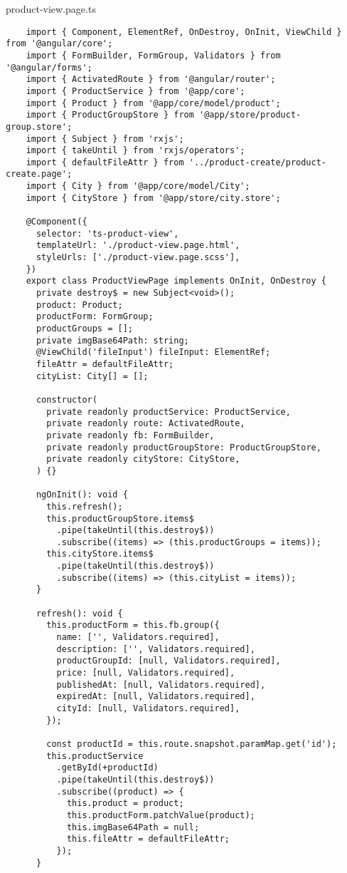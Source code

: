 product-view.page.ts
\lstset{style=ts}
\begin{lstlisting}
    import { Component, ElementRef, OnDestroy, OnInit, ViewChild } from '@angular/core';
    import { FormBuilder, FormGroup, Validators } from '@angular/forms';
    import { ActivatedRoute } from '@angular/router';
    import { ProductService } from '@app/core';
    import { Product } from '@app/core/model/product';
    import { ProductGroupStore } from '@app/store/product-group.store';
    import { Subject } from 'rxjs';
    import { takeUntil } from 'rxjs/operators';
    import { defaultFileAttr } from '../product-create/product-create.page';
    import { City } from '@app/core/model/City';
    import { CityStore } from '@app/store/city.store';
    
    @Component({
      selector: 'ts-product-view',
      templateUrl: './product-view.page.html',
      styleUrls: ['./product-view.page.scss'],
    })
    export class ProductViewPage implements OnInit, OnDestroy {
      private destroy$ = new Subject<void>();
      product: Product;
      productForm: FormGroup;
      productGroups = [];
      private imgBase64Path: string;
      @ViewChild('fileInput') fileInput: ElementRef;
      fileAttr = defaultFileAttr;
      cityList: City[] = [];
    
      constructor(
        private readonly productService: ProductService,
        private readonly route: ActivatedRoute,
        private readonly fb: FormBuilder,
        private readonly productGroupStore: ProductGroupStore,
        private readonly cityStore: CityStore,
      ) {}
    
      ngOnInit(): void {
        this.refresh();
        this.productGroupStore.items$
          .pipe(takeUntil(this.destroy$))
          .subscribe((items) => (this.productGroups = items));
        this.cityStore.items$
          .pipe(takeUntil(this.destroy$))
          .subscribe((items) => (this.cityList = items));
      }
    
      refresh(): void {
        this.productForm = this.fb.group({
          name: ['', Validators.required],
          description: ['', Validators.required],
          productGroupId: [null, Validators.required],
          price: [null, Validators.required],
          publishedAt: [null, Validators.required],
          expiredAt: [null, Validators.required],
          cityId: [null, Validators.required],
        });
    
        const productId = this.route.snapshot.paramMap.get('id');
        this.productService
          .getById(+productId)
          .pipe(takeUntil(this.destroy$))
          .subscribe((product) => {
            this.product = product;
            this.productForm.patchValue(product);
            this.imgBase64Path = null;
            this.fileAttr = defaultFileAttr;
          });
      }
    

\end{lstlisting}
